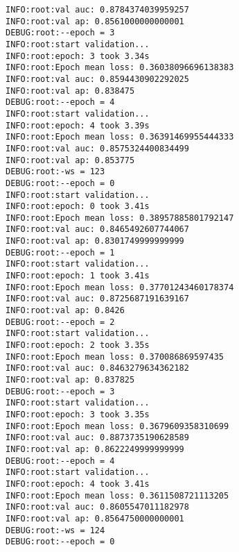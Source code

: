 \documentclass[11pt]{article}
\begin{document}
\begin{verbatim}
INFO:root:val auc: 0.8784374039959257
INFO:root:val ap: 0.8561000000000001
DEBUG:root:--epoch = 3
INFO:root:start validation...
INFO:root:epoch: 3 took 3.34s
INFO:root:Epoch mean loss: 0.36038096696138383
INFO:root:val auc: 0.8594430902292025
INFO:root:val ap: 0.838475
DEBUG:root:--epoch = 4
INFO:root:start validation...
INFO:root:epoch: 4 took 3.39s
INFO:root:Epoch mean loss: 0.36391469955444333
INFO:root:val auc: 0.8575324400834499
INFO:root:val ap: 0.853775
DEBUG:root:-ws = 123
DEBUG:root:--epoch = 0
INFO:root:start validation...
INFO:root:epoch: 0 took 3.41s
INFO:root:Epoch mean loss: 0.38957885801792147
INFO:root:val auc: 0.8465492607744067
INFO:root:val ap: 0.8301749999999999
DEBUG:root:--epoch = 1
INFO:root:start validation...
INFO:root:epoch: 1 took 3.41s
INFO:root:Epoch mean loss: 0.37701243460178374
INFO:root:val auc: 0.8725687191639167
INFO:root:val ap: 0.8426
DEBUG:root:--epoch = 2
INFO:root:start validation...
INFO:root:epoch: 2 took 3.35s
INFO:root:Epoch mean loss: 0.370086869597435
INFO:root:val auc: 0.8463279634362182
INFO:root:val ap: 0.837825
DEBUG:root:--epoch = 3
INFO:root:start validation...
INFO:root:epoch: 3 took 3.35s
INFO:root:Epoch mean loss: 0.3679609358310699
INFO:root:val auc: 0.8873735190628589
INFO:root:val ap: 0.8622249999999999
DEBUG:root:--epoch = 4
INFO:root:start validation...
INFO:root:epoch: 4 took 3.41s
INFO:root:Epoch mean loss: 0.3611508721113205
INFO:root:val auc: 0.8605547011182978
INFO:root:val ap: 0.8564750000000001
DEBUG:root:-ws = 124
DEBUG:root:--epoch = 0
\end{verbatim}
\end{document}
